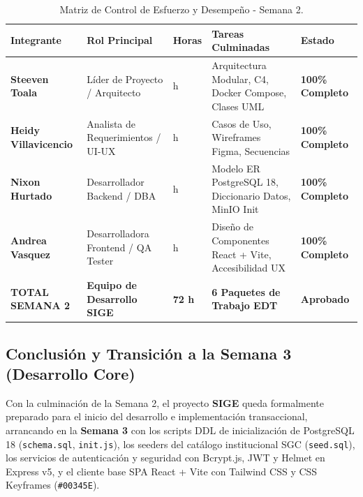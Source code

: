 \documentclass[12pt,a4paper]{article}
\begin{document}
\begin{table}[htbp]
\centering
\small
\begin{tabularx}{\textwidth}{|>{\hsize=0.7\hsize\bfseries}X|>{\hsize=1.0\hsize}X|>{\hsize=0.45\hsize\centering\arraybackslash}X|>{\hsize=1.2\hsize}X|>{\hsize=0.65\hsize\centering\arraybackslash}X|}
    \hline
    \rowcolor{tableheader}
    Integrante & Rol Principal & Horas & Tareas Culminadas & Estado \\
    \hline
    Steeven Toala & Líder de Proyecto / Arquitecto & 20 h & Arquitectura Modular, C4, Docker Compose, Clases UML & \textbf{100\% Completo} \\
    \hline
    Heidy Villavicencio & Analista de Requerimientos / UI-UX & 18 h & Casos de Uso, Wireframes Figma, Secuencias & \textbf{100\% Completo} \\
    \hline
    Nixon Hurtado & Desarrollador Backend / DBA & 18 h & Modelo ER PostgreSQL 18, Diccionario Datos, MinIO Init & \textbf{100\% Completo} \\
    \hline
    Andrea Vasquez & Desarrolladora Frontend / QA Tester & 16 h & Diseño de Componentes React + Vite, Accesibilidad UX & \textbf{100\% Completo} \\
    \hline
    \rowcolor{gray!15}
    \textbf{TOTAL SEMANA 2} & \textbf{Equipo de Desarrollo SIGE} & \textbf{72 h} & \textbf{6 Paquetes de Trabajo EDT} & \textbf{Aprobado} \\
    \hline
\end{tabularx}
\caption{Matriz de Control de Esfuerzo y Desempeño - Semana 2.}
\label{tab:s2_07_esfuerzo}
\end{table}

\subsection{Conclusión y Transición a la Semana 3 (Desarrollo Core)}
Con la culminación de la Semana 2, el proyecto \textbf{SIGE} queda formalmente preparado para el inicio del desarrollo e implementación transaccional, arrancando en la \textbf{Semana 3} con los scripts DDL de inicialización de PostgreSQL 18 (\texttt{schema.sql}, \texttt{init.js}), los seeders del catálogo institucional SGC (\texttt{seed.sql}), los servicios de autenticación y seguridad con Bcrypt.js, JWT y Helmet en Express v5, y el cliente base SPA React + Vite con Tailwind CSS y CSS Keyframes (\texttt{\#00345E}).

\vspace{0.3cm}

\end{document}
